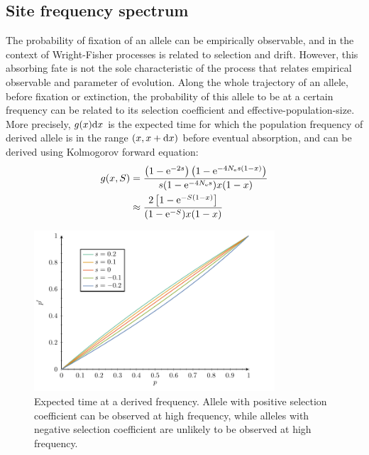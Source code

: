 \subsection{Site frequency spectrum}
The probability of fixation of an \gls{allele} can be empirically observable, and in the context of Wright-Fisher processes is related to selection and drift. 
However, this absorbing fate is not the sole characteristic of the process that relates empirical observable and parameter of evolution. 
Along the whole trajectory of an \gls{allele}, before fixation or extinction, the probability of this \gls{allele} to be at a certain frequency can be related to its selection coefficient and \gls{effective-population-size}.
More precisely, $g(x) \mathrm{d} x $ is the expected time for which the population frequency of derived \gls{allele} is in the range $(x, x+\mathrm{d} x)$ before eventual absorption, and can be derived using Kolmogorov forward equation:
\begin{align}
g(x, S) & = \dfrac{\left( 1 - \mathrm{e}^{- 2 s }\right) \left( 1 - \mathrm{e}^{-4 N_{\textrm{e}} s(1-x)}\right)}{ s (1 - \mathrm{e}^{-4 N_{\textrm{e}} s})x(1-x)} \\
& \approx \dfrac{2 \left[ 1 - \mathrm{e}^{-S(1-x)}\right]}{(1 - \mathrm{e}^{-S})x(1-x)} \label{eq:expected_time}
\end{align}

\begin{figure}[H]
	\centering
	\includegraphics[width=0.8\textwidth, page=4] {figures.pdf}
	\caption[Expected time at a derived frequency]{
	Expected time at a derived frequency.
	Allele with positive selection coefficient can be observed at high frequency, while \glspl{allele} with negative selection coefficient are unlikely to be observed at high frequency.}
\end{figure}

